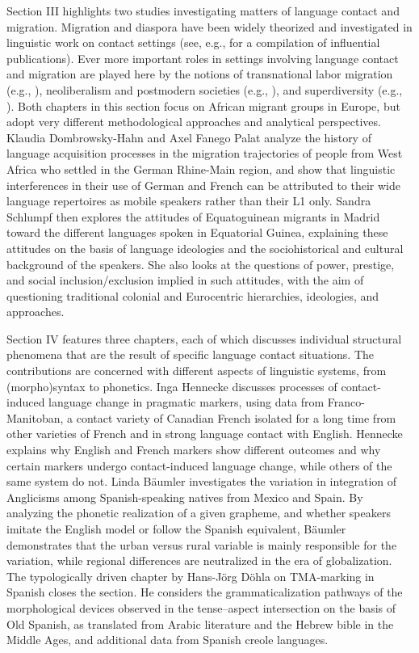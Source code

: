 \documentclass[output=paper
		  ]{langscibook}
\begin{document}
Section III highlights two studies investigating matters of language contact and migration. Migration and diaspora have been widely theorized and investigated in linguistic work on contact settings (see, e.g., \citealt{piller_language_2016} for a compilation of influential publications). Ever more important roles in settings involving language contact and migration are played here by the notions of transnational labor migration (e.g., \citealt{lorente_scripts_2018}), neoliberalism and postmodern societies (e.g., \citealt{allan_neoliberalism_2017}), and superdiversity (e.g., \citealt{creese_routledge_2018}). Both chapters in this section focus on African migrant groups in Europe, but adopt very different methodological approaches and analytical perspectives. Klaudia Dombrowsky-Hahn and Axel Fanego Palat analyze the history of language acquisition processes in the migration trajectories of people from West Africa who settled in the German Rhine-Main region, and show that linguistic interferences in their use of German and French can be attributed to their wide language repertoires as mobile speakers rather than their L1 only. Sandra Schlumpf then explores the attitudes of Equatoguinean migrants in Madrid toward the different languages spoken in Equatorial Guinea, explaining these attitudes on the basis of language ideologies and the sociohistorical and cultural background of the speakers. She also looks at the questions of power, prestige, and social inclusion/exclusion implied in such attitudes, with the aim of questioning traditional colonial and Eurocentric hierarchies, ideologies, and approaches. 

Section IV features three chapters, each of which discusses individual structural phenomena that are the result of specific language contact situations. The contributions are concerned with different aspects of linguistic systems, from (morpho)syntax to phonetics. Inga Hennecke discusses processes of contact-in\-duced language change in pragmatic markers, using data from Franco-Manitoban, a contact variety of Canadian French isolated for a long time from other varieties of French and in strong language contact with English. Hennecke explains why English and French markers show different outcomes and why certain markers undergo contact-induced language change, while others of the same system do not. Linda Bäumler investigates the variation in integration of Anglicisms among Spanish-speaking natives from Mexico and Spain. By analyzing the phonetic realization of a given grapheme, and whether speakers imitate the English model or follow the Spanish equivalent, Bäumler demonstrates that the urban versus rural variable is mainly responsible for the variation, while regional differences are neutralized in the era of globalization. The typologically driven chapter by Hans-Jörg Döhla on TMA-marking in Spanish closes the section. He considers the grammaticalization pathways of the morphological devices observed in the tense–aspect intersection on the basis of Old Spanish, as translated from Arabic literature and the Hebrew bible in the Middle Ages, and additional data from Spanish creole languages.
\end{document}
